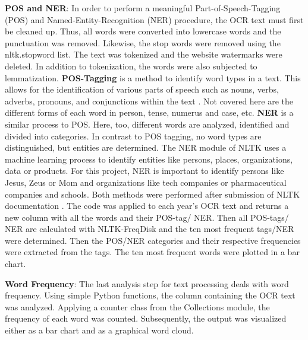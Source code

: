 \documentclass[11pt,a4paper]{article}
\begin{document}
 \par
 \textbf{POS and NER}: In order to perform a meaningful Part-of-Speech-Tagging (POS) and Named-Entity-Recognition (NER) procedure, the OCR text must first be cleaned up. Thus, all words were converted into lowercase words and the punctuation was removed. Likewise, the stop words were removed using the nltk.stopword list. The text was tokenized and the website watermarks were deleted. In addition to tokenization, the words were also subjected to lemmatization.
 \textbf{POS-Tagging} is a method to identify word types in a text. This allows for the identification of various parts of speech such as nouns, verbs, adverbs, pronouns, and conjunctions within the text \cite{Luber2022}. Not covered here are the different forms of each word in person, tense, numerus and case, etc. \textbf{NER} is a similar process to POS. Here, too, different words are analyzed, identified and divided into categories. In contrast to POS tagging, no word types are distinguished, but entities are determined. The NER module of NLTK uses a machine learning process to identify entities like persons, places, organizations, data or products. For this project, NER is important to identify persons like Jesus, Zeus or Mom and organizations like tech companies or pharmaceutical companies and schools. Both methods were performed after submission of NLTK documentation \cite{nltk2021}. The code was applied to each year's OCR text and returns a new column with all the words and their POS-tag/ NER. Then all POS-tags/ NER are calculated with NLTK-FreqDisk and the ten most frequent tags/NER were determined. Then the POS/NER categories and their respective frequencies were extracted from the tags. The ten most frequent words were plotted in a bar chart.
 \par \textbf{Word Frequency}: The last analysis step for text processing deals with word frequency. Using simple Python functions, the column containing the OCR text was analyzed. Applying a counter class from the Collections module, the frequency of each word was counted. Subsequently, the output was visualized either as a bar chart and as a graphical word cloud.
 \par
\end{document}
